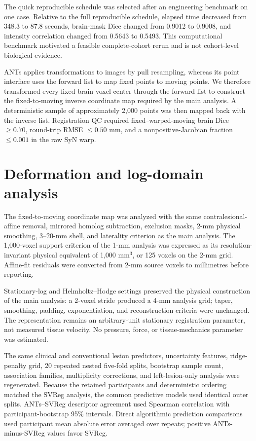 \documentclass[11pt]{article}
\begin{document}
The quick reproducible schedule was selected after an engineering benchmark on
one case. Relative to the full reproducible schedule, elapsed time decreased
from 348.3 to 87.8 seconds, brain-mask Dice changed from 0.9012 to 0.9008, and
intensity correlation changed from 0.5643 to 0.5493. This computational
benchmark motivated a feasible complete-cohort rerun and is not cohort-level
biological evidence.

ANTs applies transformations to images by pull resampling, whereas its point
interface uses the forward list to map fixed points to moving points. We
therefore transformed every fixed-brain voxel center through the forward list
to construct the fixed-to-moving inverse coordinate map required by the main
analysis. A deterministic sample of approximately 2,000 points was then mapped
back with the inverse list. Registration QC required fixed--warped-moving brain
Dice $\geq0.70$, round-trip RMSE $\leq0.50$ mm, and a nonpositive-Jacobian
fraction $\leq0.001$ in the raw SyN warp.

\section{Deformation and log-domain analysis}

The fixed-to-moving coordinate map was analyzed with the same
contralesional-affine removal, mirrored homolog subtraction, exclusion masks,
2-mm physical smoothing, 3--20-mm shell, and laterality criterion as the main
analysis. The 1,000-voxel support criterion of the 1-mm analysis was expressed
as its resolution-invariant physical equivalent of 1,000 mm$^3$, or 125 voxels
on the 2-mm grid. Affine-fit residuals were converted from 2-mm source voxels
to millimetres before reporting.

Stationary-log and Helmholtz--Hodge settings preserved the physical construction
of the main analysis: a 2-voxel stride produced a 4-mm analysis grid; taper,
smoothing, padding, exponentiation, and reconstruction criteria were unchanged.
The representation remains an arbitrary-unit stationary registration parameter,
not measured tissue velocity. No pressure, force, or tissue-mechanics parameter
was estimated.

The same clinical and conventional lesion predictors, uncertainty features,
ridge-penalty grid, 20 repeated nested five-fold splits, bootstrap sample count,
association families, multiplicity corrections, and left-lesion-only analysis
were regenerated. Because the retained participants and deterministic ordering
matched the SVReg analysis, the common predictive models used identical outer
splits. ANTs--SVReg descriptor agreement used Spearman correlation with
participant-bootstrap 95\% intervals. Direct algorithmic prediction comparisons
used participant mean absolute error averaged over repeats; positive
ANTs-minus-SVReg values favor SVReg.
\end{document}
